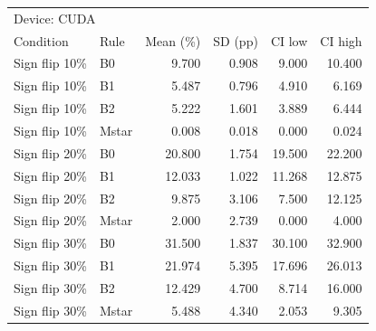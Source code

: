 \begin{tabular}{llrrrr}
\toprule
\multicolumn{6}{l}{Device: CUDA} \\
Condition & Rule & Mean (\%) & SD (pp) & CI low & CI high \\
\midrule
Sign flip 10\% & B0 & 9.700 & 0.908 & 9.000 & 10.400 \\
Sign flip 10\% & B1 & 5.487 & 0.796 & 4.910 & 6.169 \\
Sign flip 10\% & B2 & 5.222 & 1.601 & 3.889 & 6.444 \\
Sign flip 10\% & Mstar & 0.008 & 0.018 & 0.000 & 0.024 \\
Sign flip 20\% & B0 & 20.800 & 1.754 & 19.500 & 22.200 \\
Sign flip 20\% & B1 & 12.033 & 1.022 & 11.268 & 12.875 \\
Sign flip 20\% & B2 & 9.875 & 3.106 & 7.500 & 12.125 \\
Sign flip 20\% & Mstar & 2.000 & 2.739 & 0.000 & 4.000 \\
Sign flip 30\% & B0 & 31.500 & 1.837 & 30.100 & 32.900 \\
Sign flip 30\% & B1 & 21.974 & 5.395 & 17.696 & 26.013 \\
Sign flip 30\% & B2 & 12.429 & 4.700 & 8.714 & 16.000 \\
Sign flip 30\% & Mstar & 5.488 & 4.340 & 2.053 & 9.305 \\
\bottomrule
\end{tabular}
